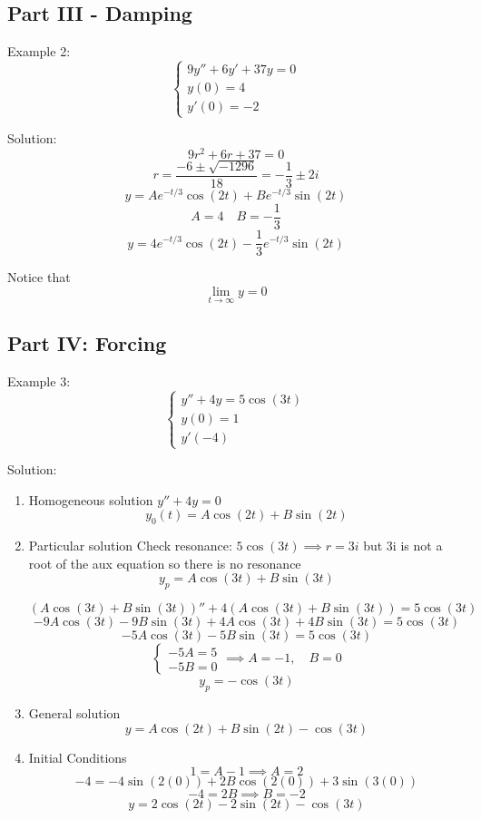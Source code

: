 \documentclass[12pt]{article}
\begin{document}
\subsection*{Part III - Damping}
Example 2:
\[\begin{cases}
    9y'' + 6y' + 37y = 0\\
    y(0) = 4\\
    y'(0) = -2
\end{cases}\]

Solution:
\[9r^2 + 6r + 37 = 0\]
\[r = \frac{-6 \pm \sqrt{-1296}}{18} = -\frac{1}{3} \pm 2i\]
\[y = Ae^{-t/3}\cos(2t)+ Be^{-t/3} \sin(2t)\]
\[A = 4 \quad B = -\frac{1}{3}\]
\[y = 4e^{-t/3}\cos(2t)- \frac{1}{3} e^{-t/3} \sin(2t)\]

Notice that
\[\lim_{t \to \infty} y = 0\]

\subsection*{Part IV: Forcing}
Example 3: 
\[\begin{cases}
    y'' + 4y = 5\cos(3t)\\
    y(0) = 1\\
    y'(-4)
\end{cases}\]

Solution:
\begin{enumerate}
    \item Homogeneous solution $y'' + 4y = 0$
    \[y_0 (t) = A \cos(2t) + B \sin(2t)\] 

    \item Particular solution 
    Check resonance: $5\cos (3t) \implies r = 3i$ but 3i is not a root of the aux equation so there is no resonance 
    \[y_p = A \cos(3t) + B\sin(3t)\]

    \[( A \cos(3t) + B\sin(3t))'' + 4( A \cos(3t) + B\sin(3t)) = 5\cos(3t)\]
    \[-9A \cos(3t) - 9B \sin(3t) + 4A\cos(3t) + 4B \sin(3t) = 5\cos(3t)\]
    \[-5A\cos(3t ) - 5B \sin (3t) = 5\cos(3t)\]
    \[\begin{cases}
        -5A = 5\\
        -5B = 0
    \end{cases} \implies A = -1, \quad B = 0\]
    \[y_p = -\cos(3t)\]

    \item General solution
    \[y = A\cos(2t) + B\sin(2t) - \cos(3t)\]

    \item Initial Conditions 
    \[1 = A - 1 \implies A = 2\]
    \[-4 = -4\sin(2(0)) + 2B\cos(2(0)) + 3\sin(3(0))\]
    \[-4 = 2B \implies B = -2\]
    \[\boxed{y = 2\cos(2t) - 2\sin(2t) -\cos(3t)}\]
\end{enumerate}
\end{document}
